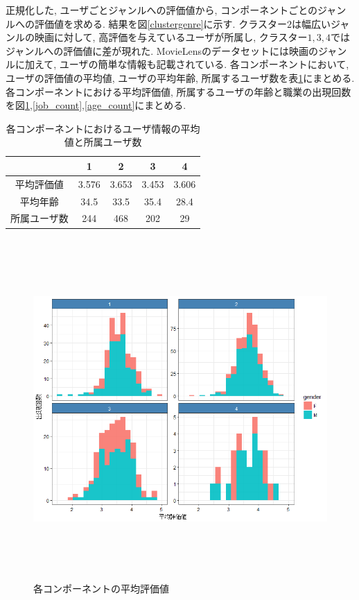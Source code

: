 \documentclass[a4j,12pt]{jarticle}
\begin{document}
正規化した, ユーザごとジャンルへの評価値から, コンポーネントごとのジャンルへの評価値を求める. 結果を図\ref{clustergenre}に示す. クラスター$2$は幅広いジャンルの映画に対して, 高評価を与えているユーザが所属し, クラスター$1,3,4$ではジャンルへの評価値に差が現れた. 
MovieLensのデータセットには映画のジャンルに加えて, ユーザの簡単な情報も記載されている. 各コンポーネントにおいて, ユーザの評価値の平均値, ユーザの平均年齢, 所属するユーザ数を表\ref{component_stat}にまとめる. 各コンポーネントにおける平均評価値, 所属するユーザの年齢と職業の出現回数を図\ref{rating_average},\ref{job_count},\ref{age_count}にまとめる. 

\begin{table}[H]
\begin{center}
\caption{各コンポーネントにおけるユーザ情報の平均値と所属ユーザ数}   %
\label{component_stat}   %
\begin{tabular}{c | c c c c}
\hline
&1 & 2 & 3 & 4 \\ \hline \hline
平均評価値 &3.576 & 3.653 & 3.453 & 3.606 \\ \hline
平均年齢 & 34.5 &  33.5 & 35.4 & 28.4 \\ \hline
所属ユーザ数 & 244 & 468 & 202 & 29 \\ \hline
\end{tabular}
\end{center}
\end{table}

\begin{figure}[tbp]
\begin{center}
\includegraphics[clip,height= 130mm]{data/rating_average.png}
\end{center}
\caption{各コンポーネントの平均評価値}
\label{rating_average}
\end{figure}
\end{document}

